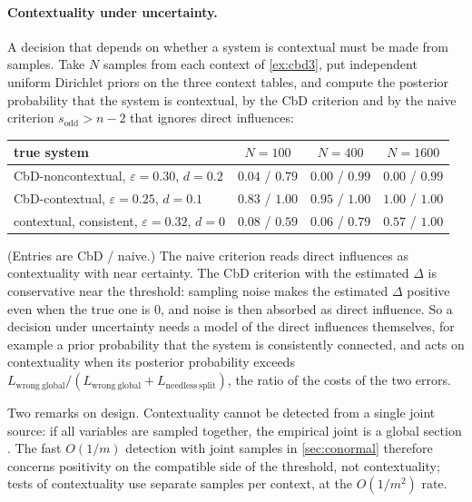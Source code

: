 \documentclass[11pt]{article}
\theoremstyle{definition}
\theoremstyle{remark}
\begin{document}
\paragraph{Contextuality under uncertainty.} A decision that depends on whether a system is contextual must be made from samples. Take
$N$ samples from each context of \cref{ex:cbd3}, put independent uniform Dirichlet priors on the three context tables, and compute the posterior
probability that the system is contextual, by the CbD criterion and by the naive criterion $s_{\mathrm{odd}}>n-2$ that ignores direct
influences:
\begin{center}
\begin{tabular}{lccc}
\toprule
true system & $N=100$ & $N=400$ & $N=1600$\\
\midrule
CbD-noncontextual, $\varepsilon=0.30$, $d=0.2$ & $0.04$ / $0.79$ & $0.00$ / $0.99$ & $0.00$ / $0.99$\\
CbD-contextual, $\varepsilon=0.25$, $d=0.1$ & $0.83$ / $1.00$ & $0.95$ / $1.00$ & $1.00$ / $1.00$\\
contextual, consistent, $\varepsilon=0.32$, $d=0$ & $0.08$ / $0.59$ & $0.06$ / $0.79$ & $0.57$ / $1.00$\\
\bottomrule
\end{tabular}
\end{center}
(Entries are CbD / naive.) The naive criterion reads direct influences as contextuality with near certainty. The CbD criterion with the
estimated $\Delta$ is conservative near the threshold: sampling noise makes the estimated $\Delta$ positive even when the true one is $0$, and
noise is then absorbed as direct influence. So a decision under uncertainty needs a model of the direct influences themselves, for example
a prior probability that the system is consistently connected, and acts on contextuality when its posterior probability exceeds
$L_{\mathrm{wrong\ global}}/(L_{\mathrm{wrong\ global}}+L_{\mathrm{needless\ split}})$, the ratio of the costs of the two errors.

Two remarks on design. Contextuality cannot be detected from a single joint source: if all variables are sampled together, the empirical
joint is a global section \cite[Thm.~1.1]{ThreeLayers}. The fast $O(1/m)$ detection with joint samples in \cref{sec:conormal} therefore
concerns positivity on the compatible side of the threshold, not contextuality; tests of contextuality use separate samples per context, at
the $O(1/m^2)$ rate.

\end{document}
